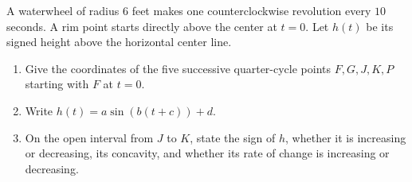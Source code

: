 A waterwheel of radius $6$ feet makes one counterclockwise revolution every $10$ seconds. A rim point starts directly above the center at $t=0$. Let $h(t)$ be its signed height above the horizontal center line.
\begin{enumerate}
\item Give the coordinates of the five successive quarter-cycle points $F,G,J,K,P$ starting with $F$ at $t=0$.
\item Write $h(t)=a\sin(b(t+c))+d$.
\item On the open interval from $J$ to $K$, state the sign of $h$, whether it is increasing or decreasing, its concavity, and whether its rate of change is increasing or decreasing.
\end{enumerate}
